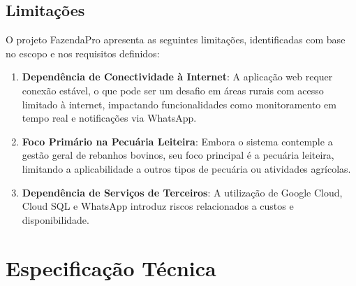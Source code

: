 \documentclass[12pt, a4paper]{article}
\begin{document}
\begin{spacing}{1.5}
\subsection{Limitações}
\begin{spacing}{1.5}
O projeto FazendaPro apresenta as seguintes limitações, identificadas com base no escopo e nos requisitos definidos:

\begin{enumerate}[label=\alph*)]
    \item \textbf{Dependência de Conectividade à Internet}: A aplicação web requer conexão estável, o que pode ser um desafio em áreas rurais com acesso limitado à internet, impactando funcionalidades como monitoramento em tempo real e notificações via WhatsApp.
    \item \textbf{Foco Primário na Pecuária Leiteira}: Embora o sistema contemple a gestão geral de rebanhos bovinos, seu foco principal é a pecuária leiteira, limitando a aplicabilidade a outros tipos de pecuária ou atividades agrícolas.
    \item \textbf{Dependência de Serviços de Terceiros}: A utilização de Google Cloud, Cloud SQL e WhatsApp introduz riscos relacionados a custos e disponibilidade.
\end{enumerate}
\end{spacing}

\section{Especificação Técnica}


\end{spacing}
\end{document}
